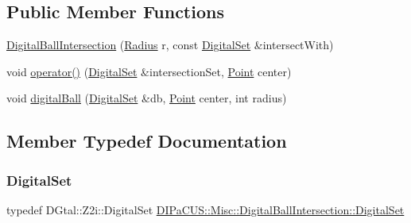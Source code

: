 \subsection*{Public Member Functions}
\begin{DoxyCompactItemize}
\item 
\mbox{\hyperlink{classDIPaCUS_1_1Misc_1_1DigitalBallIntersection_ad8f01116b05a8879e0644b57957810d0}{Digital\+Ball\+Intersection}} (\mbox{\hyperlink{classDIPaCUS_1_1Misc_1_1DigitalBallIntersection_a8c17265617201b52046579d379b3e269}{Radius}} r, const \mbox{\hyperlink{classDIPaCUS_1_1Misc_1_1DigitalBallIntersection_aaed19d165964a423d69f19a3de0d5587}{Digital\+Set}} \&intersect\+With)
\item 
void \mbox{\hyperlink{classDIPaCUS_1_1Misc_1_1DigitalBallIntersection_aa7e9ee375a80f5746cfc066666b0615d}{operator()}} (\mbox{\hyperlink{classDIPaCUS_1_1Misc_1_1DigitalBallIntersection_aaed19d165964a423d69f19a3de0d5587}{Digital\+Set}} \&intersection\+Set, \mbox{\hyperlink{classDIPaCUS_1_1Misc_1_1DigitalBallIntersection_a7e348073cb818df2e225d22746e1d6af}{Point}} center)
\item 
void \mbox{\hyperlink{classDIPaCUS_1_1Misc_1_1DigitalBallIntersection_aa8e3d86381527972021df7a28cc373d3}{digital\+Ball}} (\mbox{\hyperlink{classDIPaCUS_1_1Misc_1_1DigitalBallIntersection_aaed19d165964a423d69f19a3de0d5587}{Digital\+Set}} \&db, \mbox{\hyperlink{classDIPaCUS_1_1Misc_1_1DigitalBallIntersection_a7e348073cb818df2e225d22746e1d6af}{Point}} center, int radius)
\end{DoxyCompactItemize}


\subsection{Member Typedef Documentation}
\mbox{\label{classDIPaCUS_1_1Misc_1_1DigitalBallIntersection_aaed19d165964a423d69f19a3de0d5587}} 
\subsubsection{\texorpdfstring{Digital\+Set}{DigitalSet}}
{\footnotesize\ttfamily typedef D\+Gtal\+::\+Z2i\+::\+Digital\+Set \mbox{\hyperlink{classDIPaCUS_1_1Misc_1_1DigitalBallIntersection_aaed19d165964a423d69f19a3de0d5587}{D\+I\+Pa\+C\+U\+S\+::\+Misc\+::\+Digital\+Ball\+Intersection\+::\+Digital\+Set}}}

